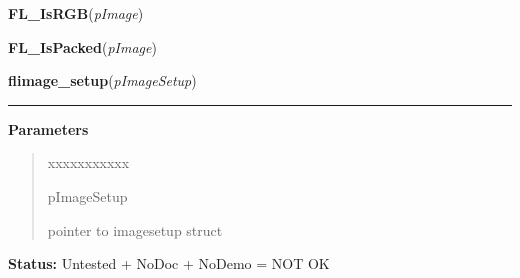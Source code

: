     \label{xformslib:library:FL_IsRGB}

    \vspace{0.5ex}

\hspace{.8\funcindent}\begin{boxedminipage}{\funcwidth}

    \raggedright \textbf{FL\_IsRGB}(\textit{pImage})

\setlength{\parskip}{2ex}
\setlength{\parskip}{1ex}
    \end{boxedminipage}

    \label{xformslib:library:FL_IsPacked}

    \vspace{0.5ex}

\hspace{.8\funcindent}\begin{boxedminipage}{\funcwidth}

    \raggedright \textbf{FL\_IsPacked}(\textit{pImage})

\setlength{\parskip}{2ex}
\setlength{\parskip}{1ex}
    \end{boxedminipage}

    \label{xformslib:library:flimage_setup}

    \vspace{0.5ex}

\hspace{.8\funcindent}\begin{boxedminipage}{\funcwidth}

    \raggedright \textbf{flimage\_setup}(\textit{pImageSetup})

    \vspace{-1.5ex}

    \rule{\textwidth}{0.5\fboxrule}
\setlength{\parskip}{2ex}
\setlength{\parskip}{1ex}
      \textbf{Parameters}
      \vspace{-1ex}

      \begin{quote}
        \begin{Ventry}{xxxxxxxxxxx}

          \item[pImageSetup]

          pointer to imagesetup struct

        \end{Ventry}

      \end{quote}

\textbf{Status:} Untested + NoDoc + NoDemo = NOT OK



    \end{boxedminipage}

